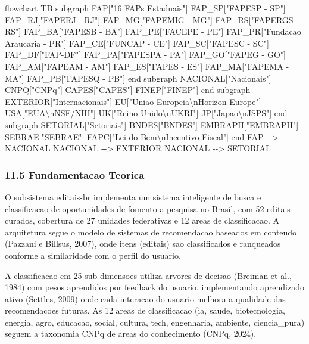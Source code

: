 \documentclass[
  12pt,
]{article}
\newenvironment{Shaded}{}{}
\newcommand{\NormalTok}[1]{#1}
\begin{document}
\begin{Shaded}
\begin{Highlighting}[]
\NormalTok{flowchart TB}
\NormalTok{subgraph FAP["16 FAPs Estaduais"]}
\NormalTok{FAP\_SP["FAPESP {-} SP"]}
\NormalTok{FAP\_RJ["FAPERJ {-} RJ"]}
\NormalTok{FAP\_MG["FAPEMIG {-} MG"]}
\NormalTok{FAP\_RS["FAPERGS {-} RS"]}
\NormalTok{FAP\_BA["FAPESB {-} BA"]}
\NormalTok{FAP\_PE["FACEPE {-} PE"]}
\NormalTok{FAP\_PR["Fundacao Araucaria {-} PR"]}
\NormalTok{FAP\_CE["FUNCAP {-} CE"]}
\NormalTok{FAP\_SC["FAPESC {-} SC"]}
\NormalTok{FAP\_DF["FAP{-}DF"]}
\NormalTok{FAP\_PA["FAPESPA {-} PA"]}
\NormalTok{FAP\_GO["FAPEG {-} GO"]}
\NormalTok{FAP\_AM["FAPEAM {-} AM"]}
\NormalTok{FAP\_ES["FAPES {-} ES"]}
\NormalTok{FAP\_MA["FAPEMA {-} MA"]}
\NormalTok{FAP\_PB["FAPESQ {-} PB"]}
\NormalTok{end}
\NormalTok{subgraph NACIONAL["Nacionais"]}
\NormalTok{CNPQ["CNPq"]}
\NormalTok{CAPES["CAPES"]}
\NormalTok{FINEP["FINEP"]}
\NormalTok{end}
\NormalTok{subgraph EXTERIOR["Internacionais"]}
\NormalTok{EU["Uniao Europeia\textbackslash{}nHorizon Europe"]}
\NormalTok{USA["EUA\textbackslash{}nNSF/NIH"]}
\NormalTok{UK["Reino Unido\textbackslash{}nUKRI"]}
\NormalTok{JP["Japao\textbackslash{}nJSPS"]}
\NormalTok{end}
\NormalTok{subgraph SETORIAL["Setoriais"]}
\NormalTok{BNDES["BNDES"]}
\NormalTok{EMBRAPII["EMBRAPII"]}
\NormalTok{SEBRAE["SEBRAE"]}
\NormalTok{FAPC["Lei do Bem\textbackslash{}nIncentivo Fiscal"]}
\NormalTok{end}
\NormalTok{FAP {-}{-}\textgreater{} NACIONAL}
\NormalTok{NACIONAL {-}{-}\textgreater{} EXTERIOR}
\NormalTok{NACIONAL {-}{-}\textgreater{} SETORIAL}
\end{Highlighting}
\end{Shaded}

\subsubsection{11.5 Fundamentacao
Teorica}\label{fundamentacao-teorica-10}

O subsistema editais-br implementa um sistema inteligente de busca e
classificacao de oportunidades de fomento a pesquisa no Brasil, com 52
editais curados, cobertura de 27 unidades federativas e 12 areas de
classificacao. A arquitetura segue o modelo de sistemas de recomendacao
baseados em conteudo (Pazzani e Billsus, 2007), onde itens (editais) sao
classificados e ranqueados conforme a similaridade com o perfil do
usuario.

A classificacao em 25 sub-dimensoes utiliza arvores de decisao (Breiman
et al., 1984) com pesos aprendidos por feedback do usuario,
implementando aprendizado ativo (Settles, 2009) onde cada interacao do
usuario melhora a qualidade das recomendacoes futuras. As 12 areas de
classificacao (ia, saude, biotecnologia, energia, agro, educacao,
social, cultura, tech, engenharia, ambiente, ciencia\_pura) seguem a
taxonomia CNPq de areas do conhecimento (CNPq, 2024).
\end{document}
